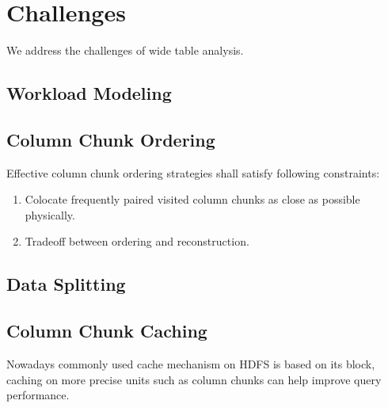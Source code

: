 \section{Challenges}
We address the challenges of wide table analysis.
\subsection{Workload Modeling}

\subsection{Column Chunk Ordering}
Effective column chunk ordering strategies shall satisfy following constraints:
\begin{enumerate}
	\item Colocate frequently paired visited column chunks as close as possible physically.
	\item Tradeoff between ordering and reconstruction.
\end{enumerate}
\subsection{Data Splitting}

\subsection{Column Chunk Caching}
Nowadays commonly used cache mechanism on HDFS is based on its block, caching on more precise units such as column chunks can help improve query performance.